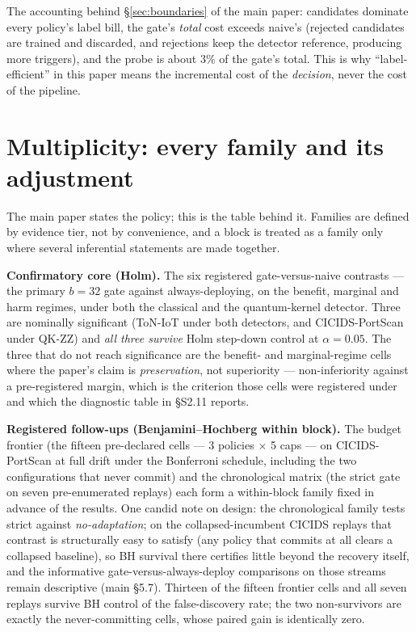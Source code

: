 \documentclass[a4paper,11pt]{article}
\begin{document}
The accounting behind \S\ref{sec:boundaries} of the main paper: candidates dominate every policy's label
bill, the gate's \emph{total} cost exceeds naive's (rejected candidates are trained and
discarded, and rejections keep the detector reference, producing more triggers), and the
probe is about 3\% of the gate's total. This is why ``label-efficient'' in this paper means
the incremental cost of the \emph{decision}, never the cost of the pipeline.



\section{Multiplicity: every family and its adjustment}
\label{sec:s5multiplicity}

The main paper states the policy; this is the table behind it. Families are defined by
evidence tier, not by convenience, and a block is treated as a family only where several
inferential statements are made together.

\textbf{Confirmatory core (Holm).} The six registered gate-versus-naive contrasts --- the
primary $b{=}32$ gate against always-deploying, on the benefit, marginal and harm regimes,
under both the classical and the quantum-kernel detector. Three are nominally significant
(ToN-IoT under both detectors, and CICIDS-PortScan under QK-ZZ) and \emph{all three survive}
Holm step-down control at $\alpha{=}0.05$. The three that do not reach significance are the
benefit- and marginal-regime cells where the paper's claim is \emph{preservation}, not
superiority --- non-inferiority against a pre-registered margin, which is the criterion those
cells were registered under and which the diagnostic table in \S S2.11 reports.

\textbf{Registered follow-ups (Benjamini--Hochberg within block).} The budget frontier
(the fifteen pre-declared cells --- 3 policies $\times$ 5 caps --- on CICIDS-PortScan at
full drift under the Bonferroni schedule, including the two configurations that never
commit) and the chronological matrix (the strict gate on seven pre-enumerated replays) each
form a within-block family fixed in advance of the results. One candid note on design:
the chronological family tests strict against \emph{no-adaptation}; on the
collapsed-incumbent CICIDS replays that contrast is structurally easy to satisfy (any
policy that commits at all clears a collapsed baseline), so BH survival there certifies
little beyond the recovery itself, and the informative gate-versus-always-deploy
comparisons on those streams remain descriptive (main \S5.7). Thirteen of the fifteen
frontier cells and all seven replays survive BH control of the false-discovery rate; the
two non-survivors are exactly the never-committing cells, whose paired gain is identically
zero.
\end{document}
